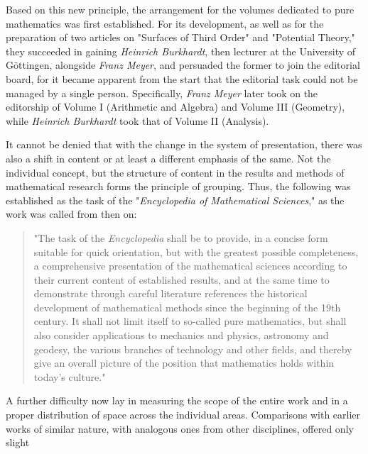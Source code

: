 \thispagestyle{fancy}

\vspace{0.5cm}

Based on this new principle, the arrangement for the volumes dedicated to pure mathematics was first established. For its development, as well as for the preparation of two articles on "Surfaces of Third Order" and "Potential Theory," they succeeded in gaining \textit{Heinrich Burkhardt}, then lecturer at the University of Göttingen, alongside \textit{Franz Meyer}, and persuaded the former to join the editorial board, for it became apparent from the start that the editorial task could not be managed by a single person. Specifically, \textit{Franz Meyer} later took on the editorship of Volume I (Arithmetic and Algebra) and Volume III (Geometry), while \textit{Heinrich Burkhardt} took that of Volume II (Analysis).

It cannot be denied that with the change in the system of presentation, there was also a shift in content or at least a different emphasis of the same. Not the individual concept, but the structure of content in the results and methods of mathematical research forms the principle of grouping. Thus, the following was established as the task of the "\textit{Encyclopedia of Mathematical Sciences}," as the work was called from then on:

\begin{quote}
"The task of the \textit{Encyclopedia} shall be to provide, in a concise form suitable for quick orientation, but with the greatest possible completeness, a comprehensive presentation of the mathematical sciences according to their current content of established results, and at the same time to demonstrate through careful literature references the historical development of mathematical methods since the beginning of the 19th century. It shall not limit itself to so-called pure mathematics, but shall also consider applications to mechanics and physics, astronomy and geodesy, the various branches of technology and other fields, and thereby give an overall picture of the position that mathematics holds within today's culture."
\end{quote}

A further difficulty now lay in measuring the scope of the entire work and in a proper distribution of space across the individual areas. Comparisons with earlier works of similar nature, with analogous ones from other disciplines, offered only slight
